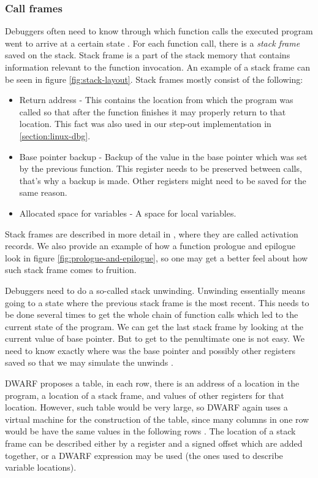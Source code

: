 \subsubsection{Call frames}\label{section:call-frames}
Debuggers often need to know through which function calls the executed program
went to arrive at a certain state \cite{dwarf}. For each function call, there
is a \textit{stack frame} saved on the stack. Stack frame is a part of the stack memory that
contains information relevant to the function invocation. An example of a
stack frame can be seen in figure \ref{fig:stack-layout}.
Stack frames mostly consist of the following:
\begin{itemize}
    \item Return address - This contains the location from which the program
        was called so that after the function finishes it may properly return
        to that location. This fact was also used in our step-out
        implementation in \ref{section:linux-dbg}.
    \item Base pointer backup - Backup of the value in the base pointer which
        was set by the previous function. This register needs to be preserved
        between calls, that's why a backup is made. Other registers might need
        to be saved for the same reason.
    \item Allocated space for variables - A space for local variables.
\end{itemize}
Stack frames are described in more detail in \cite{dragon-book}, where they are
called activation records. We also provide an example of how a function
prologue and epilogue look in figure \ref{fig:prologue-and-epilogue}, so one
may get a better feel about how such stack frame comes to fruition.

Debuggers need to do a so-called stack unwinding. Unwinding essentially means
going to a state where the previous stack frame is the most recent. This needs
to be done several times to get the whole chain of function calls which led to
the current state of the program. We can get the last stack frame by looking at
the current value of base pointer. But to get to the penultimate one is not
easy. We need to know exactly where was the base pointer and possibly other
registers saved so that we may simulate the unwinds \cite{dwarf}.

DWARF proposes a table, in each row, there is an address of a location in the
program, a location of a stack frame, and values of other registers for that
location. However, such table would be very large, so DWARF again uses a
virtual machine for the construction of the table, since many columns in one
row would be have the same values in the following rows \cite{dwarf}. The
location of a stack frame can be described either by a register and a signed
offset which are added together, or a DWARF expression may be used (the ones
used to describe variable locations).

